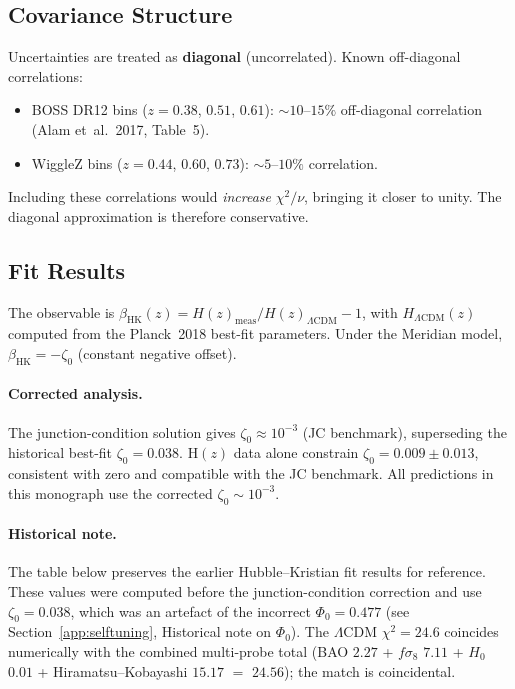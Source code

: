 \subsection{Covariance Structure}

Uncertainties are treated as \textbf{diagonal} (uncorrelated). Known off-diagonal correlations:
\begin{itemize}
\item BOSS DR12 bins ($z = 0.38$, $0.51$, $0.61$): $\sim\!10$--$15\%$ off-diagonal correlation (Alam et~al.\ 2017, Table~5).
\item WiggleZ bins ($z = 0.44$, $0.60$, $0.73$): $\sim\!5$--$10\%$ correlation.
\end{itemize}
Including these correlations would \emph{increase} $\chi^2/\nu$, bringing it closer to unity. The diagonal approximation is therefore conservative.

\subsection{Fit Results}

The observable is $\beta_{\mathrm{HK}}(z) = H(z)_{\mathrm{meas}} / H(z)_{\Lambda\mathrm{CDM}} - 1$, with $H_{\Lambda\mathrm{CDM}}(z)$ computed from the Planck~2018 best-fit parameters. Under the Meridian model, $\beta_{\mathrm{HK}} = -\zeta_0$ (constant negative offset).

\paragraph{Corrected analysis.} The junction-condition solution gives $\zeta_0 \approx 10^{-3}$ (JC benchmark), superseding the historical best-fit $\zeta_0 = 0.038$. H$(z)$ data alone constrain $\zeta_0 = 0.009 \pm 0.013$, consistent with zero and compatible with the JC benchmark. All predictions in this monograph use the corrected $\zeta_0 \sim 10^{-3}$.

\paragraph{Historical note.} The table below preserves the earlier Hubble--Kristian fit results for reference. These values were computed before the junction-condition correction and use $\zeta_0 = 0.038$, which was an artefact of the incorrect $\Phi_0 = 0.477$ (see Section~\ref{app:selftuning}, Historical note on $\Phi_0$). The $\Lambda$CDM $\chi^2 = 24.6$ coincides numerically with the combined multi-probe total (BAO $2.27$ + $f\sigma_8$ $7.11$ + $H_0$ $0.01$ + Hiramatsu--Kobayashi $15.17$ $=$ $24.56$); the match is coincidental.

